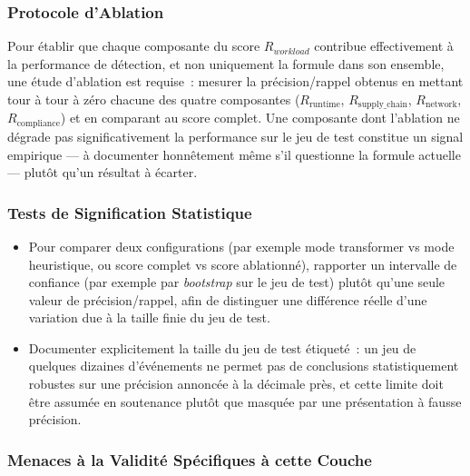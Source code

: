 \subsubsection{Protocole d'Ablation}

Pour établir que chaque composante du score $R_{workload}$ contribue effectivement à la performance de détection, et non uniquement la formule dans son ensemble, une étude d'ablation est requise~: mesurer la précision/rappel obtenus en mettant tour à tour à zéro chacune des quatre composantes ($R_{\text{runtime}}$, $R_{\text{supply\_chain}}$, $R_{\text{network}}$, $R_{\text{compliance}}$) et en comparant au score complet. Une composante dont l'ablation ne dégrade pas significativement la performance sur le jeu de test constitue un signal empirique — à documenter honnêtement même s'il questionne la formule actuelle — plutôt qu'un résultat à écarter.

\subsubsection{Tests de Signification Statistique}

\begin{itemize}
    \item Pour comparer deux configurations (par exemple mode transformer vs mode heuristique, ou score complet vs score ablationné), rapporter un intervalle de confiance (par exemple par \textit{bootstrap} sur le jeu de test) plutôt qu'une seule valeur de précision/rappel, afin de distinguer une différence réelle d'une variation due à la taille finie du jeu de test.
    \item Documenter explicitement la taille du jeu de test étiqueté~: un jeu de quelques dizaines d'événements ne permet pas de conclusions statistiquement robustes sur une précision annoncée à la décimale près, et cette limite doit être assumée en soutenance plutôt que masquée par une présentation à fausse précision.
\end{itemize}

\subsubsection{Menaces à la Validité Spécifiques à cette Couche}

